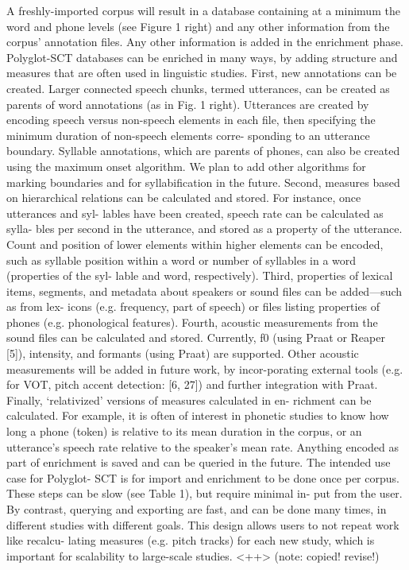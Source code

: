 \documentclass[11pt]{article}
\begin{document}
A freshly-imported corpus will result in a database containing at
a minimum the word and phone levels (see Figure 1 right) and
any other information from the corpus’ annotation files. Any
other information is added in the enrichment phase.
Polyglot-SCT databases can be enriched in many ways, by
adding structure and measures that are often used in linguistic
studies. First, new annotations can be created. Larger connected
speech chunks, termed utterances, can be created as parents of
word annotations (as in Fig. 1 right). Utterances are created by
encoding speech versus non-speech elements in each file, then
specifying the minimum duration of non-speech elements corre-
sponding to an utterance boundary. Syllable annotations, which
are parents of phones, can also be created using the maximum
onset algorithm. We plan to add other algorithms for marking
boundaries and for syllabification in the future.
Second, measures based on hierarchical relations can be
calculated and stored. For instance, once utterances and syl-
lables have been created, speech rate can be calculated as sylla-
bles per second in the utterance, and stored as a property of the
utterance. Count and position of lower elements within higher
elements can be encoded, such as syllable position within a
word or number of syllables in a word (properties of the syl-
lable and word, respectively).
Third, properties of lexical items, segments, and metadata
about speakers or sound files can be added—such as from lex-
icons (e.g. frequency, part of speech) or files listing properties
of phones (e.g. phonological features).
Fourth, acoustic measurements from the sound files can
be calculated and stored. Currently, f0 (using Praat or Reaper
[5]), intensity, and formants (using Praat) are supported. Other
acoustic measurements will be added in future work, by incor-porating external tools (e.g. for VOT, pitch accent detection:
[6, 27]) and further integration with Praat.
Finally, ‘relativized’ versions of measures calculated in en-
richment can be calculated. For example, it is often of interest
in phonetic studies to know how long a phone (token) is relative
to its mean duration in the corpus, or an utterance’s speech rate
relative to the speaker’s mean rate.
Anything encoded as part of enrichment is saved and can
be queried in the future. The intended use case for Polyglot-
SCT is for import and enrichment to be done once per corpus.
These steps can be slow (see Table 1), but require minimal in-
put from the user. By contrast, querying and exporting are fast,
and can be done many times, in different studies with different
goals. This design allows users to not repeat work like recalcu-
lating measures (e.g. pitch tracks) for each new study, which is
important for scalability to large-scale studies.
<++> (note: copied! revise!)
\end{document}
